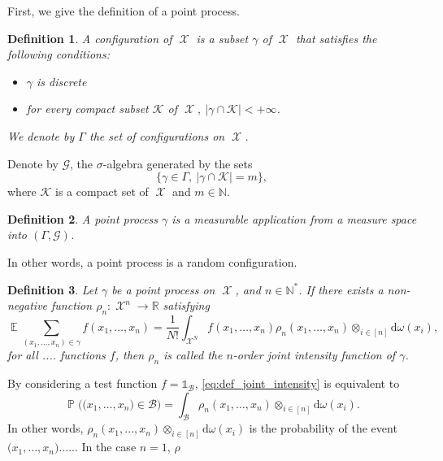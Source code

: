 \documentclass[twoside,11pt]{book}
\newtheorem{definition}{Definition}
\DeclareMathOperator{\EX}{\mathbb{E}}
\DeclareMathOperator{\Prb}{\mathbb{P}}
\DeclareMathOperator{\X}{\mathcal{X}}
\begin{document}
First, we give the definition of a point process. 

\begin{definition}
A configuration of $\X$ is a subset $\gamma$ of $\X$ that satisfies the following conditions:
\begin{itemize}
\item $\gamma$ is discrete 
\item for every compact subset $\mathcal{K}$ of $\X, \: |\gamma \cap \mathcal{K}| < +\infty $.

\end{itemize}
We denote by $\Gamma$ the set of configurations on $\X$.
\end{definition}

Denote by $\mathcal{G}$, the $\sigma$-algebra generated by the sets 
\begin{equation}
\{\gamma \in \Gamma, \: |\gamma \cap \mathcal{K}| = m \},
\end{equation}
where $\mathcal{K}$ is a compact set of $\X$ and $m \in \mathbb{N}$.



\begin{definition}
A point process $\gamma$ is a measurable application from a measure space into $(\Gamma, \mathcal{G})$.
\end{definition}

In other words, a point process is a random configuration.  

\begin{definition}
Let $\gamma$ be a point process on $\X$, and $n \in \mathbb{N}^{*}$. If there exists a non-negative function $\rho_{n}: \X^{n} \rightarrow \mathbb{R} $ satisfying 
\begin{equation}\label{eq:def_joint_intensity}
\EX \sum\limits_{(x_{1}, \dots, x_{n}) \in \gamma } f(x_{1}, \dots, x_{n}) = \frac{1}{N!} \int_{\X^{N}} f(x_{1}, \dots, x_{n}) \rho_{n}(x_{1}, \dots, x_{n}) \otimes_{i \in [n]} \mathrm{d}\omega(x_{i}),
\end{equation}
for all .... functions $f$, then $\rho_{n}$ is called the $n$-order joint intensity function of $\gamma$.
\end{definition}
By considering a test function $f = \mathbb{1}_{\mathcal{B}}$, \eqref{eq:def_joint_intensity} is equivalent to 
\begin{equation}
\Prb \bigg(\big(x_{1}, \dots, x_{n} \big) \in \mathcal{B} \bigg) = \int_{\mathcal{B}} \rho_{n}(x_{1}, \dots, x_{n}) \otimes_{i \in [n]}\mathrm{d}\omega(x_{i}).
\end{equation}
In other words, $\rho_{n}(x_{1}, \dots, x_{n}) \otimes_{i \in [n]}\mathrm{d}\omega(x_{i})$ is the probability of the event $\big(x_{1}, \dots, x_{n} \big)...$...
In the case $n = 1$, $\rho$
\end{document}
